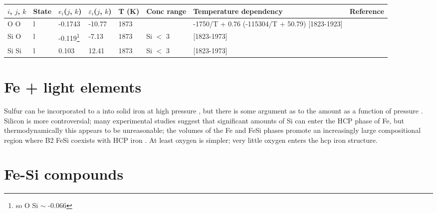 \documentclass[11pt,a4paper,english]{article}
\begin{document}
\begin{table}[h]
\begin{minipage}{20cm}
\begin{tabular}{llllllp{2.7cm}l}
$i$, $j$, $k$ & State & $e_i$($j$, $k$) & $\varepsilon_i$($j$, $k$) & T (K) & Conc range & Temperature dependency         & Reference \\
\hline
O O           & l     & -0.1743                                  & -10.77 & 1873  &            & -1750/T + 0.76 (-115304/T + 50.79) {[}1823-1923{]} & \cite{SS1959} \\
Si O          & l     & -0.119\footnote{so O Si $\sim$ -0.066} & -7.13 & 1873  & Si $<$ 3   & {[}1823-1973{]}                & \cite{SF1983} \\
Si Si         & l     & 0.103                                  & 12.41 & 1873  & Si $<$ 3   & {[}1823-1973{]}                & \cite{SF1983} 
\end{tabular}
\end{minipage}
\end{table}

\section{Fe + light elements}
Sulfur can be incorporated to a into solid iron at high pressure \citep[Fig. 6 of ][]{MAAB2014}, but there is some argument as to the amount as a function of pressure \citep{SSWL2007, CB2007, Kamadaetal2010}. Silicon is more controversial; many experimental studies suggest that significant amounts of Si can enter the HCP phase of Fe, but thermodynamically this appears to be unreasonable; the volumes of the Fe and FeSi phases promote an increasingly large compositional region where B2 FeSi coexists with HCP iron \cite{BMS2009}. At least oxygen is simpler; very little oxygen enters the hcp iron structure.




\section{Fe-Si compounds}
\end{document}
